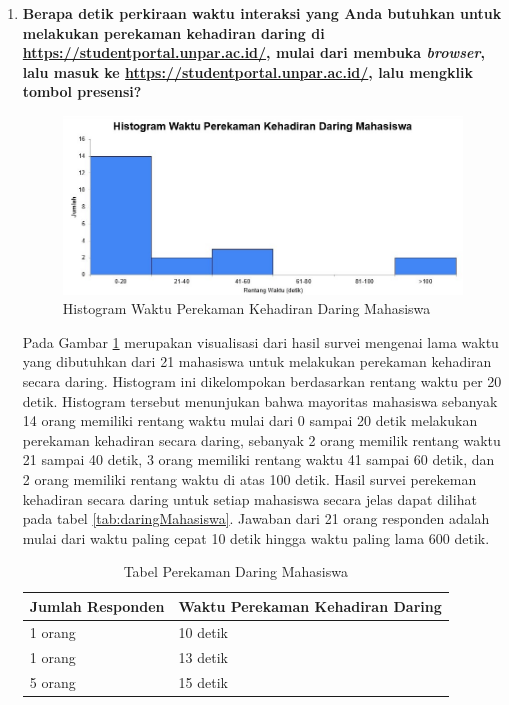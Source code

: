 \begin{enumerate}
	\item \textbf{Berapa detik perkiraan waktu interaksi yang Anda butuhkan untuk melakukan perekaman kehadiran daring di \url{https://studentportal.unpar.ac.id/}, mulai dari membuka \textit{browser}, lalu masuk ke \url{https://studentportal.unpar.ac.id/}, lalu mengklik tombol presensi?}
	\begin{figure}[H]
		\centering
		\includegraphics[scale=0.6]{Gambar/DaringMahasiswa.jpg}
		\caption{Histogram Waktu Perekaman Kehadiran Daring Mahasiswa} 
		\label{fig:DaringMahasiswa}
	\end{figure}
	Pada Gambar \ref{fig:DaringMahasiswa} merupakan visualisasi dari hasil survei mengenai lama waktu yang dibutuhkan dari 21 mahasiswa untuk melakukan perekaman kehadiran secara daring. Histogram ini dikelompokan berdasarkan rentang waktu per 20 detik. Histogram tersebut menunjukan bahwa mayoritas mahasiswa sebanyak 14 orang memiliki rentang waktu mulai dari 0 sampai 20 detik melakukan perekaman kehadiran secara daring, sebanyak 2 orang memilik rentang waktu 21 sampai 40 detik, 3 orang memiliki rentang waktu 41 sampai 60 detik, dan 2 orang memiliki rentang waktu di atas 100 detik. Hasil survei perekeman kehadiran secara daring untuk setiap mahasiswa secara jelas dapat dilihat pada tabel \ref{tab:daringMahasiswa}. Jawaban dari 21 orang responden adalah mulai dari waktu paling cepat 10 detik hingga waktu paling lama 600 detik.
	\newpage
	\begin{table}[ht]			
		\caption{Tabel Perekaman Daring Mahasiswa}
		\centering
		\begin{tabular}{|p{4cm} |p{7cm}|}\hline
			Jumlah Responden &  Waktu Perekaman Kehadiran Daring \\ \hline     
			1 orang &  10 detik\\ \hline 
			1 orang &  13 detik\\ \hline 
			5 orang &  15 detik\\ \hline 

\end{tabular}
\end{table}
\end{enumerate}
